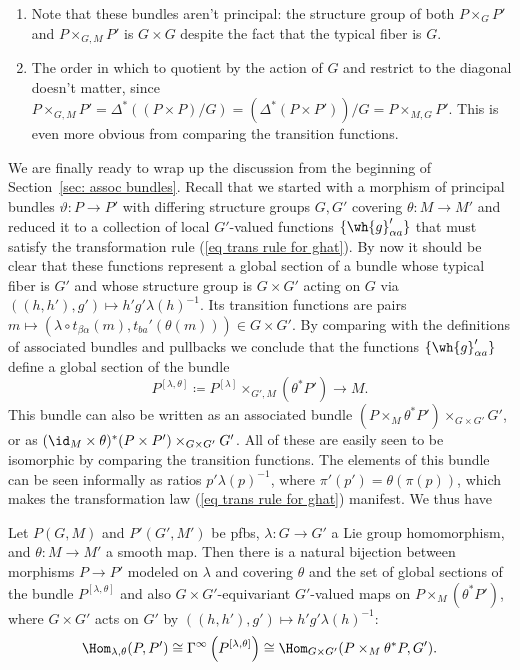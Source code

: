 \begin{rem}
\begin{enumerate}
    \item Note that these bundles aren't principal: the structure group of both $P\times_G P'$ and $P\times_{G,M}P'$ is $G\times G$ despite the fact that the typical fiber is $G$.
    \item The order in which to quotient by the action of $G$ and restrict to the diagonal doesn't matter, since $P\times_{G,M}P'=\Delta^\ast((P\times P)\slash G)=(\Delta^\ast(P\times P'))\slash G=P\times_{M,G}P'$. This is even more obvious from comparing the transition functions.
\end{enumerate}
\end{rem}


We are finally ready to wrap up the discussion from the beginning of Section~\ref{sec: assoc bundles}. Recall that we started with a morphism of principal bundles $\vartheta:P\to P'$ with differing structure groups $G,G'$ covering $\theta:M\to M'$ and reduced it to a collection of local $G'$-valued functions $\{\wh{g}_{\alpha a}'\}$ that must satisfy the transformation rule (\ref{eq trans rule for ghat}). By now it should be clear that these functions represent a global section of a bundle whose typical fiber is $G'$ and whose structure group is $G\times G'$ acting on $G$ via $((h,h'),g')\mapsto h'g'\lambda(h)^{-1}$. Its transition functions are pairs $m\mapsto (\lambda\circ t_{\beta\alpha}(m),t_{ba}'(\theta(m)))\in G\times G'$. By comparing with the definitions of associated bundles and pullbacks we conclude that the functions $\{\wh{g}_{\alpha a}'\}$ define a global section of the bundle
\[\boxed{P^{[\lambda,\theta]}\coloneqq P^{[\lambda]}\times_{G',M}(\theta^\ast P')\to M.}\]
This bundle can also be written as an associated bundle $(P\times_M \theta^\ast P')\times_{G\times G'} G'$, or as $(\id_M\times \theta)^\ast(P\times P')\times_{G\times G'}G'$. All of these are easily seen to be isomorphic by comparing the transition functions. The elements of this bundle can be seen informally as ratios $p'\lambda(p)^{-1}$, where $\pi'(p')=\theta(\pi(p))$, which makes the transformation law (\ref{eq trans rule for ghat}) manifest. We thus have
\begin{prop}\label{prop pfb morphisms}
    Let $P(G,M)$ and $P'(G',M')$ be \glspl{pfb}, $\lambda:G\to G'$ a Lie group homomorphism, and $\theta:M\to M'$ a smooth map. Then there is a natural bijection between morphisms $P\to P'$ modeled on $\lambda$ and covering $\theta$ and the set of global sections of the bundle $P^{[\lambda,\theta]}$ and also $G\times G'$-equivariant $G'$-valued maps on $P\times_M (\theta^\ast P')$, where $G\times G'$ acts on $G'$ by $((h,h'),g')\mapsto h'g'\lambda(h)^{-1}$:
    \[\Hom_{\lambda,\theta}(P,P')\cong \Gamma^\infty\left(P^{[\lambda,\theta]}\right)\cong \Hom_{G\times G'}(P\times_M \theta^\ast P,G').\]
\end{prop}


